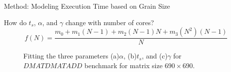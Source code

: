 \documentclass[10pt]{beamer}
\begin{document}
\begin{frame}{Method: Modeling Execution Time based on Grain Size}
	\begin{outline}	
	\1How do $t_s$, $\alpha$, and $\gamma$ change with number of cores?
		$$f(N)=\frac{m_0+m_1(N-1)+m_2(N-1)N+m_3(N^2)(N-1)}{N}$$
	\begin{figure}[]
		\centering
		\hfill	
		\caption{Fitting the three parameters (a)$\alpha$, (b)$t_s$, and (c)$\gamma$ for $DMATDMATADD$ benchmark for matrix size $690\times690$.}	
		\label{fig24}
	\end{figure}
\end{outline}
\end{frame}
\end{document}
